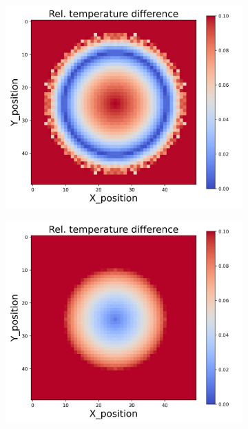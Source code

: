 {\begin{figure}[h]
\begin{minipage}{\textwidth}
\begin{subfigure}{0.27\textwidth}
        \end{subfigure}
    \end{minipage}\\
    \begin{minipage}{\textwidth}
        \centering
        \begin{subfigure}{0.27\textwidth}
            \centering
            \includegraphics[width=\textwidth]{figures/raw_data/25/exp/T_bias.jpg}
        \end{subfigure}
        \begin{subfigure}{0.27\textwidth}
            \centering
            \includegraphics[width=\textwidth]{figures/raw_data/26/exp/T_bias.jpg}

\end{subfigure}
\end{minipage}
\end{figure}}
